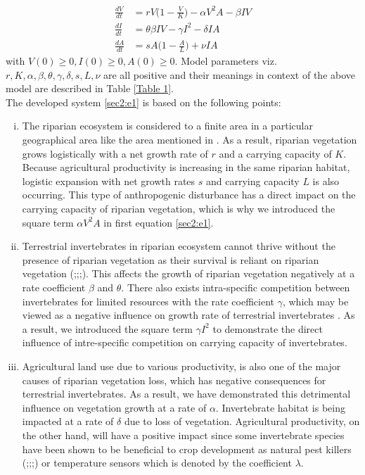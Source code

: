 \documentclass[12pt]{article}
\numberwithin{equation}{section}
\begin{document}
\begin{subequations}\label{sec2:e1}
	\begin{align}
	\frac{dV}{dt}&=rV\bigg(1-\frac{V}{K}\bigg)-\alpha V^2A -\beta IV\\
	\frac{dI}{dt}&=\theta \beta IV -\gamma I^2 - \delta IA\\
	\frac{dA}{dt}&= sA\bigg(1-\frac{A}{L}\bigg)+\nu IA
	\end{align}
\end{subequations}
with $V(0) \geq 0, I(0)\geq 0, A(0)\geq 0$. Model parameters viz. $r, K, \alpha, \beta, \theta, \gamma, \delta, s, L, \nu$ are all positive and their meanings in context of the above model are described in Table \ref{Table 1}.  \\
The developed system \eqref{sec2:e1} is based on the following points:
\begin{enumerate}[i).]
\item The riparian ecosystem is considered to a finite area in a particular geographical area like the area mentioned in \cite{popescu2021riparian}. As a result, riparian vegetation grows logistically with a net growth rate of $r$ and a carrying capacity of $K$. Because agricultural productivity is increasing in the same riparian habitat, logistic expansion with net growth rates $s$ and carrying capacity $L$ is also occurring. This type of anthropogenic disturbance has a direct impact on the carrying capacity of riparian vegetation, which is why we introduced the square term $\alpha V^2A$ in first equation \eqref{sec2:e1}.
\item Terrestrial invertebrates in riparian ecosystem cannot thrive without the presence of riparian vegetation as their survival is reliant on riparian vegetation (\cite{popescu2021riparian};\cite{edwards1996effect};\cite{ramey2017terrestrial};\cite{forio2020small}). This affects the growth of riparian vegetation negatively at a rate coefficient $\beta$ and $\theta$. There also exists intra-specific competition between invertebrates for limited resources with the rate coefficient $\gamma$, which may be viewed as a negative influence on growth rate of terrestrial invertebrates \cite{ruetz2003interspecific}. As a result, we introduced the square term $\gamma I^2$ to demonstrate the direct influence of intre-specific competition on carrying capacity of invertebrates.
\item Agricultural land use due to various productivity, is also one of the major causes of riparian vegetation loss, which has negative consequences for terrestrial invertebrates. As a result, we have demonstrated this detrimental influence on vegetation growth at a rate of $\alpha$. Invertebrate habitat is being impacted at a rate of $\delta$ due to loss of vegetation. Agricultural productivity, on the other hand, will have a positive impact since some invertebrate species have been shown to be beneficial to crop development as natural pest killers (\cite{krell2015aquatic};\cite{riis2020global};\cite{stockan2014effects};\cite{cole2012riparian}) or temperature sensors \cite{greenwood1995patial} which is denoted by the coefficient $\lambda$.
\end{enumerate}
\end{document}
